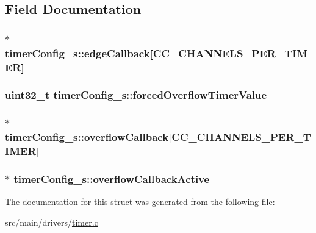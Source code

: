 \subsection{Field Documentation}
\hypertarget{structtimerConfig__s_a1a87609027e48b8074a6e1f2e9738498}{
\subsubsection[{edge\+Callback}]{$\ast$ timer\+Config\+\_\+s\+::edge\+Callback\mbox{[}{\bf C\+C\+\_\+\+C\+H\+A\+N\+N\+E\+L\+S\+\_\+\+P\+E\+R\+\_\+\+T\+I\+M\+E\+R}\mbox{]}}}\label{structtimerConfig__s_a1a87609027e48b8074a6e1f2e9738498}
\hypertarget{structtimerConfig__s_a616d1b6e69e169f8a5fc74f3ed9cc33d}{
\subsubsection[{forced\+Overflow\+Timer\+Value}]{\setlength{\rightskip}{0pt plus 5cm}uint32\+\_\+t timer\+Config\+\_\+s\+::forced\+Overflow\+Timer\+Value}}\label{structtimerConfig__s_a616d1b6e69e169f8a5fc74f3ed9cc33d}
\hypertarget{structtimerConfig__s_a3afc65145acd1add4dab12f9babccbe8}{
\subsubsection[{overflow\+Callback}]{$\ast$ timer\+Config\+\_\+s\+::overflow\+Callback\mbox{[}{\bf C\+C\+\_\+\+C\+H\+A\+N\+N\+E\+L\+S\+\_\+\+P\+E\+R\+\_\+\+T\+I\+M\+E\+R}\mbox{]}}}\label{structtimerConfig__s_a3afc65145acd1add4dab12f9babccbe8}
\hypertarget{structtimerConfig__s_a65ea1a39aba83eaab55aef7c0cea049e}{
\subsubsection[{overflow\+Callback\+Active}]{$\ast$ timer\+Config\+\_\+s\+::overflow\+Callback\+Active}}\label{structtimerConfig__s_a65ea1a39aba83eaab55aef7c0cea049e}


The documentation for this struct was generated from the following file\+:\begin{DoxyCompactItemize}
\item 
src/main/drivers/\hyperlink{timer_8c}{timer.\+c}\end{DoxyCompactItemize}

